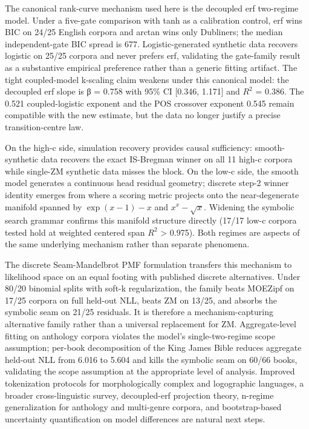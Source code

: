 \documentclass[11pt]{article}
\begin{document}
The canonical rank-curve mechanism used here is the decoupled erf two-regime model. Under a five-gate comparison with tanh as a calibration control, erf wins BIC on 24/25 English corpora and arctan wins only Dubliners; the median independent-gate BIC spread is 677. Logistic-generated synthetic data recovers logistic on 25/25 corpora and never prefers erf, validating the gate-family result as a substantive empirical preference rather than a generic fitting artifact. The tight coupled-model k-scaling claim weakens under this canonical model: the decoupled erf slope is β = 0.758 with 95\% CI [0.346, 1.171] and $R^2$ = 0.386. The 0.521 coupled-logistic exponent and the POS crossover exponent 0.545 remain compatible with the new estimate, but the data no longer justify a precise transition-centre law.

On the high-c side, simulation recovery provides causal sufficiency: smooth-synthetic data recovers the exact IS-Bregman winner on all 11 high-c corpora while single-ZM synthetic data misses the block. On the low-c side, the smooth model generates a continuous head residual geometry; discrete step-2 winner identity emerges from where a scoring metric projects onto the near-degenerate manifold spanned by $\exp(x-1)-x$ and $x^x-\sqrt{x}$. Widening the symbolic search grammar confirms this manifold structure directly (17/17 low-c corpora tested hold at weighted centered span $R^2$ > 0.975). Both regimes are aspects of the same underlying mechanism rather than separate phenomena.

The discrete Seam-Mandelbrot PMF formulation transfers this mechanism to likelihood space on an equal footing with published discrete alternatives. Under 80/20 binomial splits with soft-k regularization, the family beats MOEZipf on 17/25 corpora on full held-out NLL, beats ZM on 13/25, and absorbs the symbolic seam on 21/25 residuals. It is therefore a mechanism-capturing alternative family rather than a universal replacement for ZM. Aggregate-level fitting on anthology corpora violates the model's single-two-regime scope assumption; per-book decomposition of the King James Bible reduces aggregate held-out NLL from 6.016 to 5.604 and kills the symbolic seam on 60/66 books, validating the scope assumption at the appropriate level of analysis. Improved tokenization protocols for morphologically complex and logographic languages, a broader cross-linguistic survey, decoupled-erf projection theory, n-regime generalization for anthology and multi-genre corpora, and bootstrap-based uncertainty quantification on model differences are natural next steps.


\nocite{*}



        
\end{document}
